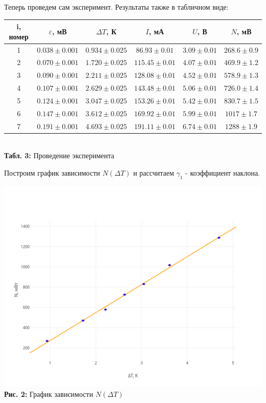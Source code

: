 \documentclass[12pt,a4paper]{scrartcl}
\begin{document}
	Теперь проведем сам эксперимент. Результаты также в табличном виде:
	\begin{center}
		\begin{tabular}{|c|c|c|c|c|c|}
			\hline
			i, номер & $\varepsilon$, мВ & $\Delta T$, К & $I$, мА & $U$, В & $N$, мВ
			\\\hline
			1 & $0.038 \pm 0.001$ & $0.934 \pm 0.025$ & $86.93 \pm 0.01$ & $3.09 \pm 0.01$ & $268.6 \pm 0.9$
			\\\hline
			2 & $0.070 \pm 0.001$ & $1.720 \pm 0.025$ & $115.45 \pm 0.01$ & $4.07 \pm 0.01$ & $469.9 \pm 1.2$
			\\\hline
			3 & $0.090 \pm 0.001$ & $2.211 \pm 0.025$ & $128.08 \pm 0.01$ & $4.52 \pm 0.01$ & $578.9 \pm 1.3$
			\\\hline
			4 & $0.107 \pm 0.001$ & $2.629 \pm 0.025$ & $143.48 \pm 0.01$ & $5.06 \pm 0.01$ & $726.0 \pm 1.4$
			\\\hline
			5 & $0.124 \pm 0.001$ & $3.047 \pm 0.025$ & $153.26 \pm 0.01$ & $5.42 \pm 0.01$ & $830.7 \pm 1.5$
			\\\hline
			6 & $0.147 \pm 0.001$ & $3.612 \pm 0.025$ & $169.92 \pm 0.01$ & $5.99 \pm 0.01$ & $1017 \pm 1.7$
			\\\hline
			7 & $0.191 \pm 0.001$ & $4.693 \pm 0.025$ & $191.11 \pm 0.01$ & $6.74 \pm 0.01$ & $1288 \pm 1.9$
			\\\hline
 		\end{tabular}
 		\\\textbf{Табл. 3:} Проведение эксперимента
	\end{center}

	Построим график зависимости $N(\Delta T)$ и рассчитаем $\gamma_1$ - коэффициент наклона.
	
	\begin{center}
		\includegraphics[scale=0.112]{PIC_2.png}
		\\\textbf{Рис. 2:} График зависимости $N(\Delta T)$
	\end{center}
\end{document}
